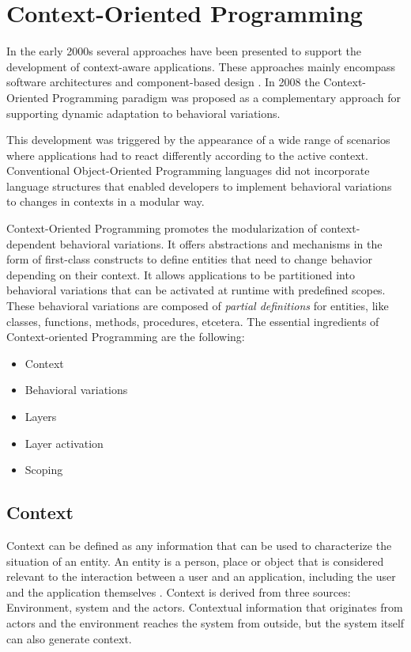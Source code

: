 \documentclass{acm_proc_article-sp}
\begin{document}
\section{Context-Oriented Programming}
\label{cop}
In the early 2000s several approaches have been presented to support the development of context-aware applications. These approaches mainly encompass software architectures and component-based design \cite{SALVANESCHI20121801}. In 2008 the Context-Oriented Programming paradigm was proposed \cite{HirschfeldCostanzaNierstraszCOP} as a complementary approach for supporting dynamic adaptation to behavioral variations. 

This development was triggered by the appearance of a wide range of scenarios where applications had to react differently according to the active context. Conventional Object-Oriented Programming languages did not incorporate language structures that enabled developers to implement behavioral variations to changes in contexts in a modular way. 

Context-Oriented Programming promotes the modularization of context-dependent behavioral variations. It offers abstractions and mechanisms in the form of first-class constructs to define entities that need to change behavior depending on their context. It allows applications to be partitioned into behavioral variations that can be activated at runtime with predefined scopes. These behavioral variations are composed of \textit{partial definitions} for entities, like classes, functions, methods, procedures, etcetera. The essential ingredients of Context-oriented Programming \cite{Costanza:2008:CPC:1529966.1529970} are the following:

\begin{itemize}
\item {Context}
\item Behavioral variations
\item Layers
\item Layer activation
\item Scoping
\end{itemize}

\subsection{Context}
\label{sec:context}
Context can be defined as any information that can be used to characterize the situation of an entity. An entity is a person, place or object that is considered relevant to the interaction between a user and an application, including the user and the application themselves \cite{Abowd:1999:TBU:647985.743843}. Context is derived from three sources: Environment, system and the actors. Contextual information that originates from actors and the environment reaches the system from outside, but the system itself can also generate context. 
\end{document}
